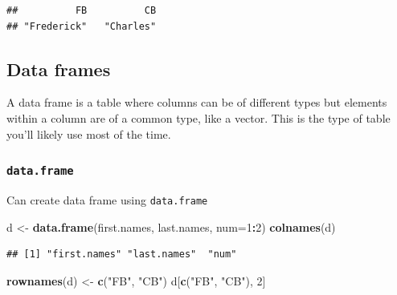 \documentclass[]{article}
\newenvironment{Shaded}{\begin{snugshade}}{\end{snugshade}}
\newcommand{\KeywordTok}[1]{\textcolor[rgb]{0.13,0.29,0.53}{\textbf{#1}}}
\newcommand{\DataTypeTok}[1]{\textcolor[rgb]{0.13,0.29,0.53}{#1}}
\newcommand{\DecValTok}[1]{\textcolor[rgb]{0.00,0.00,0.81}{#1}}
\newcommand{\StringTok}[1]{\textcolor[rgb]{0.31,0.60,0.02}{#1}}
\newcommand{\CommentTok}[1]{\textcolor[rgb]{0.56,0.35,0.01}{\textit{#1}}}
\newcommand{\OperatorTok}[1]{\textcolor[rgb]{0.81,0.36,0.00}{\textbf{#1}}}
\newcommand{\NormalTok}[1]{#1}
\begin{document}
\begin{Shaded}
\end{Shaded}

\begin{verbatim}
##          FB          CB 
## "Frederick"   "Charles"
\end{verbatim}

\subsection{Data frames}\label{data-frames}

A data frame is a table where columns can be of different types but
elements within a column are of a common type, like a vector. This is
the type of table you'll likely use most of the time.

\subsubsection{\texorpdfstring{\texttt{data.frame}}{data.frame}}\label{data.frame}

Can create data frame using \texttt{data.frame}

\begin{Shaded}
\begin{Highlighting}[]
\NormalTok{d <-}\StringTok{ }\KeywordTok{data.frame}\NormalTok{(first.names, last.names, }\DataTypeTok{num=}\DecValTok{1}\OperatorTok{:}\DecValTok{2}\NormalTok{)}
\KeywordTok{colnames}\NormalTok{(d)}
\end{Highlighting}
\end{Shaded}

\begin{verbatim}
## [1] "first.names" "last.names"  "num"
\end{verbatim}

\begin{Shaded}
\begin{Highlighting}[]
\KeywordTok{rownames}\NormalTok{(d) <-}\StringTok{ }\KeywordTok{c}\NormalTok{(}\StringTok{"FB"}\NormalTok{, }\StringTok{"CB"}\NormalTok{)}
\NormalTok{d[}\KeywordTok{c}\NormalTok{(}\StringTok{"FB"}\NormalTok{, }\StringTok{"CB"}\NormalTok{), }\DecValTok{2}\NormalTok{]}
\end{Highlighting}
\end{Shaded}
\end{document}
